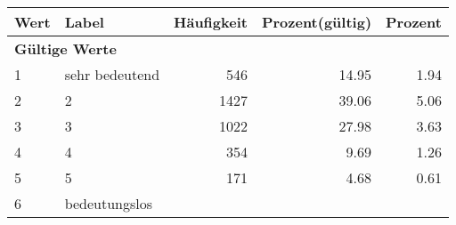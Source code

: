      \begin{longtable}{lXrrr}
     \toprule
     \textbf{Wert} & \textbf{Label} & \textbf{Häufigkeit} & \textbf{Prozent(gültig)} & \textbf{Prozent} \\
     \endhead
     \midrule
     \multicolumn{5}{l}{\textbf{Gültige Werte}}\\

     1 &
     \multicolumn{1}{X}{ sehr bedeutend   } &


       \num{546} &
       \num[round-mode=places,round-precision=2]{14.95} &
         \num[round-mode=places,round-precision=2]{1.94} \\

     2 &
     \multicolumn{1}{X}{ 2   } &


       \num{1427} &
       \num[round-mode=places,round-precision=2]{39.06} &
         \num[round-mode=places,round-precision=2]{5.06} \\

     3 &
     \multicolumn{1}{X}{ 3   } &


       \num{1022} &
       \num[round-mode=places,round-precision=2]{27.98} &
         \num[round-mode=places,round-precision=2]{3.63} \\

     4 &
     \multicolumn{1}{X}{ 4   } &


       \num{354} &
       \num[round-mode=places,round-precision=2]{9.69} &
         \num[round-mode=places,round-precision=2]{1.26} \\

     5 &
     \multicolumn{1}{X}{ 5   } &


       \num{171} &
       \num[round-mode=places,round-precision=2]{4.68} &
         \num[round-mode=places,round-precision=2]{0.61} \\

     6 &
     \multicolumn{1}{X}{ bedeutungslos   } &



\end{longtable}
